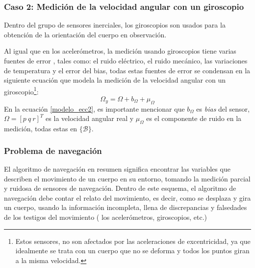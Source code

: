 \documentclass[10pt]{report}
\numberwithin{equation}{chapter}
\numberwithin{algorithm}{chapter}
\newcommand{\marco}[1]{\{\mathcal{#1}\}}
\begin{document}
\subsubsection{Caso 2: Medición de la velocidad angular con un giroscopio}
Dentro del grupo de sensores inerciales, los giroscopios son usados para la obtención de la orientación del cuerpo en observación. \par Al igual que en los acelerómetros, la medición usando giroscopios tiene varias fuentes de error , tales como: el ruido eléctrico, el ruido mecánico, las variaciones de temperatura y el error del bias, todas estas fuentes de error se condensan en la siguiente ecuación que modela la medición de la velocidad angular con un giroscopio\footnote{Estos sensores, no son afectados por las aceleraciones de excentricidad, ya que idealmente se trata con un cuerpo que no se deforma y todos los puntos giran a la misma velocidad.}: 
\begin{equation}\label{modelo_ecc2}
\Omega_y=\Omega+b_\Omega+\mu_\Omega
\end{equation}
En la ecuación \eqref{modelo_ecc2}, es importante mencionar que $b_\Omega$ es \emph{bias} del sensor, $\Omega=[p~q~r]^T$ es la velocidad angular real y $\mu_\Omega$ es el componente de ruido en la medición, todas estas en $\marco{B}$.
\subsubsection{Problema de navegación}
El algoritmo de navegación en resumen significa encontrar las variables que describen el movimiento de un cuerpo en su entorno, tomando la medición parcial y ruidosa de sensores de navegación. Dentro de este esquema, el algoritmo de navegación debe contar el relato del movimiento, es decir, como se desplaza y gira un cuerpo, usando la información incompleta, llena de discrepancias y falsedades de los testigos del movimiento ( los acelerómetros, giroscopios, etc.)\par
\end{document}
